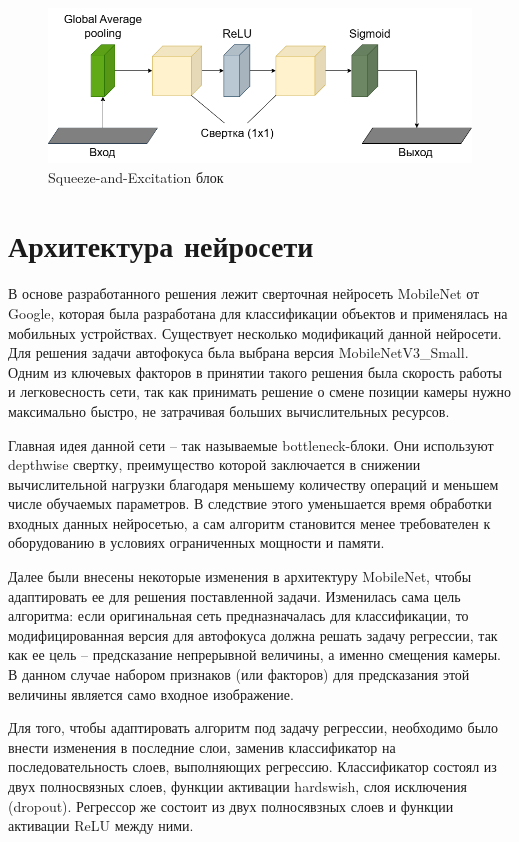 \begin{figure}[ht] 
	\center
	\includegraphics [scale=0.5] {my_folder/images/FocusNet-Копия SE layer.png}
	\caption{Squeeze-and-Excitation блок}
	\label{fig:SE_block}
\end{figure}

\section{Архитектура нейросети} \label{ch2:architecture}

В основе разработанного решения лежит сверточная нейросеть MobileNet от Google, которая была разработана для классификации объектов и применялась на мобильных устройствах. Существует несколько модификаций данной нейросети. Для решения задачи автофокуса бьла выбрана версия MobileNetV3\_Small. Одним из ключевых факторов в принятии такого решения была скорость работы и легковесность сети, так как принимать решение о смене позиции камеры нужно максимально быстро, не затрачивая больших вычислительных ресурсов.

Главная идея данной сети -- так называемые bottleneck-блоки. Они используют depthwise свертку, преимущество которой заключается в снижении вычислительной нагрузки благодаря меньшему количеству операций и меньшем числе обучаемых параметров. В следствие этого уменьшается время обработки входных данных нейросетью, а сам алгоритм становится менее требователен к оборудованию в условиях ограниченных мощности и памяти.

Далее были внесены некоторые изменения в архитектуру MobileNet, чтобы адаптировать ее для решения поставленной задачи. Изменилась сама цель алгоритма: если оригинальная сеть предназначалась для классификации, то модифицированная версия для автофокуса должна решать задачу регрессии, так как ее цель -- предсказание непрерывной величины, а именно смещения камеры. В данном случае набором признаков (или факторов) для предсказания этой величины является само входное изображение.

Для того, чтобы адаптировать алгоритм под задачу регрессии, необходимо было внести изменения в последние слои, заменив классификатор на последовательность слоев, выполняющих регрессию. Классификатор состоял из двух полносвязных слоев, функции активации hardswish, слоя исключения (dropout). Регрессор же состоит из двух полносявзных слоев и функции активации ReLU между ними.

